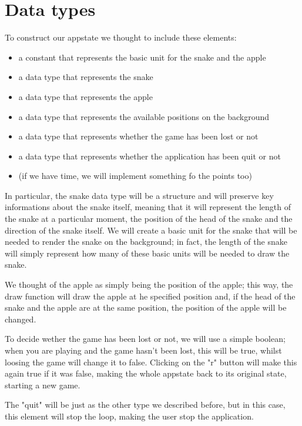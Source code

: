\documentclass{article}
\begin{document}
	\section{Data types}
	To construct our appstate we thought to include these elements:
	\begin{itemize}
		\item a constant that represents the basic unit for the snake and the apple
		\item a data type that represents the snake
		\item a data type that represents the apple
		\item a data type that represents the available positions on the background
		\item a data type that represents whether the game has been lost or not
		\item a data type that represents whether the application has been quit or not
		\item (if we have time, we will implement something fo the points too)
	\end{itemize}
	
	In particular, the snake data type will be a structure and will preserve key informations about the snake itself, meaning that it will represent the length of the snake at a particular moment, the position of the head of the snake and the direction of the snake itself.
	We will create a basic unit for the snake that will be needed to render the snake on the background; in fact, the length of the snake will simply represent how many of these basic units will be needed to draw the snake. 
	
	We thought of the apple as simply being the position of the apple; this way, the draw function will draw the apple at he specified position and, if the head of the snake and the apple are at the same position, the position of the apple will be changed.
	
	To decide wether the game has been lost or not, we will use a simple boolean; when you are playing and the game hasn't been lost, this will be true, whilst loosing the game will change it to false. Clicking on the "r" button will make this again true if it was false, making the whole appstate back to its original state, starting a new game. 
	
	The "quit" will be just as the other type we described before, but in this case, this element will stop the loop, making the user stop the application.
	
\end{document}
